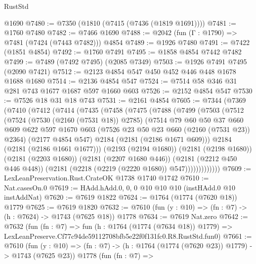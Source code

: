 \begin{lexlean}{RustStd}
\begin{coremodule}
    @1690
@7480 := @7350 (@1810 (@7415 (@7436 (@1819 @1691))))
@7481 := @1760 @7480
@7482 := @7466 @1690
@7488 := @2042 (fun (Γ : @1790) => @7481 (@7424 (@7443 @7482))) @4854
@7489 := @1926 @7480
@7491 := @7422 (@1851 @4854)
@7492 := @1760 @7491
@7495 := @1858 @4854 @7442 @7482
@7499 := @7489 (@7492 @7495) (@2085 @7349)
@7503 := @1926 @7491 @7495 (@2090 @7421)
@7512 := @2123 @4854 @547 @450 @452 @446 @448 @1678 @1688 @1680
@7514 := @2136 @4854 @547
@7524 := @7514 @58 @346 @31 @281 @743 @1677 @1687 @597 @1660 @603
@7526 := @2152 @4854 @547
@7530 := @7526 @18 @31 @18 @743
@7531 := @2161 @4854
@7605 := @7344
    (@7369
      (@7410
        (@7412
          (@7414
            (@7435
              (@7458
                (@7475
                  (@7488
                    (@7499
                      (@7503
                        (@7512
                          (@7524
                            (@7530 (@2160 (@7531 @18)) @2785)
                            (@7514
                              @79
                              @60
                              @50
                              @37
                              @660
                              @609
                              @622
                              @597
                              @1670
                              @603
                              (@7526 @23 @50 @23 @660 (@2160 (@7531 @23)) @2364)
                              (@2177 @4854 @547)
                              @2184
                              (@2181 (@2186 @1671 @609)))
                            @2184
                            (@2181 (@2186 @1661 @1677)))
                          (@2193 (@2194 @1680))
                          (@2181 (@2198 @1680))
                          (@2181 (@2203 @1680))
                          (@2181 (@2207 @1680 @446))
                          (@2181 (@2212 @450 @446 @448))
                          (@2181 (@2218 (@2219 (@2220 @1680)) @547)))))))))))))
@7609 := LexLeanPreservation.Rust.CrateOK @1738 @1740 @1742
@7610 := Nat.casesOn.{0}
@7619 := HAdd.hAdd.{0, 0, 0} @10 @10 @10 (instHAdd.{0} @10 instAddNat)
@7620 := @7619 @1822
@7624 := @1764 (@1774 (@7620 @18)) @1779
@7625 := @7619 @1820
@7632 := @7610 (fun (y : @10) => (fn : @7) -> (h : @7624) -> @1743 (@7625 @18)) @1778
@7634 := @7619 Nat.zero
@7642 := @7632
    (fun (fn : @7) =>
    fun (h : @1764 (@1774 (@7634 @18)) @1779) =>
    LexLeanPreserve.Cf77c94de59112708bfb5e22f0f131fc0.R8.RustStd.fun0)
@7661 := @7610
    (fun (y : @10) => (fn : @7) -> (h : @1764 (@1774 (@7620 @23)) @1779) -> @1743 (@7625 @23))
    @1778
    (fun (fn : @7) =>

\end{coremodule}
\end{lexlean}
